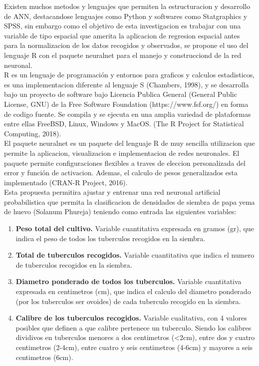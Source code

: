 Existen muchos metodos y lenguajes que permiten la estructuracion y desarrollo de ANN, destacandose lenguajes como Python y softwares como Statgraphics y SPSS, sin embargo como el objetivo de esta investigacion es trabajar con una variable de tipo espacial que amerita la aplicacion de regresion espacial antes para la normalizacion de los datos recogidos y observados, se propone el uso del lenguaje  R con el paquete neuralnet para el manejo y construcciond de la red neuronal.\\

R es un lenguaje de programación y entornos para graficos y calculos estadisticos, es una implementacion diferente al lenguaje S (Chambers, 1998), y se desarrolla bajo un proyecto de software bajo Licencia Publica General (General Public License, GNU) de la Free Software Foundation (https://www.fsf.org/) en forma de codigo fuente. Se compila y se ejecuta en una amplia variedad de plataformas entre ellas FreeBSD, Linux, Windows y MacOS. (The R Project for Statistical Computing, 2018).\\

El paquete neuralnet es un paquete del lenguaje R de muy sencilla utilizacion que permite la aplicacion, visualizacion e implementacion de redes neuronales. El paquete permite configuraciones flexibles a traves de
eleccion personalizada del error y función de activacion. Ademas, el calculo de pesos generalizados esta implementado (CRAN-R Project, 2016).\\

Esta propuesta permitira ajustar y entrenar una red neuronal artificial probabilistica que permita la clasificacion de densidades de siembra de papa yema de huevo (Solanum Phureja) teniendo como entrada las siguientes variables: 

\begin{enumerate}
    \item{\textbf{Peso total del cultivo.} Variable cuantitativa expresada en gramos (gr), que indica el peso de todos los tuberculos recogidos en la siembra.}
	\item{\textbf{Total de tuberculos recogidos.} Variable cuantitativa que indica el numero de tuberculos recogidos en la siembra.}
	\item{\textbf{Diametro ponderado de todos los tuberculos.} Variable cuantitativa expresada en centimetros (cm), que indica el calculo del diametro ponderado (por los tuberculos ser ovoides) de cada tuberculo recogido en la siembra.}
	\item{\textbf{Calibre de los tuberculos recogidos.} Variable cualitativa, con 4 valores posibles que definen a que calibre pertenece un tuberculo. Siendo los calibres dividivos en tuberculos menores a dos centimetros (<2cm), entre dos y cuatro centimetros (2-4cm), entre cuatro y seis centimetros (4-6cm) y mayores a seis centimetros (6cm).}
\end{enumerate}

